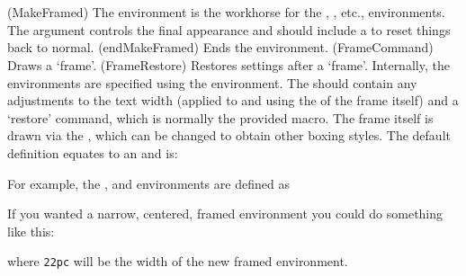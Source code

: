 \begin{syntax}
\cmd{\MakeFramed} \cmd{\endMakeFramed} \\
\cmd{\FrameCommand} \cmd{\FrameRestore} \\
\end{syntax}
\glossary(MakeFramed)%
  {}%
  {The  environment is the workhorse for the
   , , etc., environments.
   The  argument controls the final appearance and
   should include a  to reset things back to normal.}
\glossary(endMakeFramed)%
  {}%
  {Ends the  environment.}
\glossary(FrameCommand)%
  {}%
  {Draws a `frame'.}
\glossary(FrameRestore)%
  {}%
  {Restores settings after a `frame'.}
Internally, the environments are specified using the 
environment. The  should contain any adjustments to the 
text width
(applied to \lnc{\hsize} and using the \lnc{\width} of the frame itself)
and a `restore' command, which is normally the provided \cmd{\FrameRestore}
macro. The frame itself is drawn via the 
\cmd{\FrameCommand}, which can be changed to obtain other boxing styles. The
default definition equates to an \cmd{\fbox} and is:
\begin{lcode}
\newcommand*{\FrameCommand}{%
  \setlength{\fboxrule}{\FrameRule}\setlength{\fboxsep}{\FrameSep}%
  \fbox}
\end{lcode}
For example, the ,  and  environments 
are defined as
\begin{lcode}
\newenvironment{framed}{%
  \MakeFramed{\advance\hsize -\width \FrameRestore}}%
  {\endMakeFramed}
\newenvironment{shaded}{%
  \def\FrameCommand{\fboxsep=\FrameSep \colorbox{shadecolor}}%
  \MakeFramed{\FrameRestore}}%
  {\endMakeFramed}
\newenvironment{snugshade}{%
  \def\FrameCommand{\colorbox{shadecolor}}%
  \MakeFramed{\FrameRestore\@setminipage}}%
  {\par\unskip\endMakeFramed}
\end{lcode}

    If you wanted a narrow, centered, framed 
environment you could do something like this:
\begin{lcode}
\newenvironment{narrowframed}{%
  \MakeFramed{\setlength{\hsize}{22pc}\FrameRestore}}%
  {\endMakeFramed}
\end{lcode}
where \texttt{22pc} will be the width of the new framed environment.


